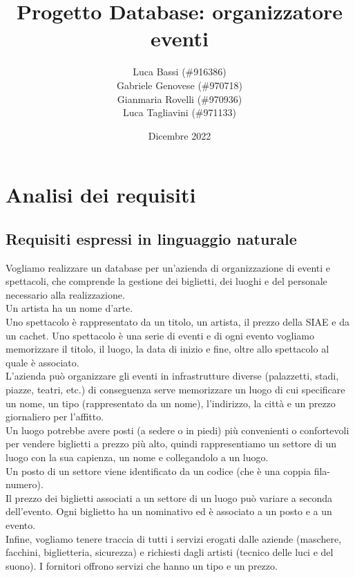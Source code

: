 \documentclass[a4paper,11pt]{article}
\title{Progetto Database: organizzatore eventi}
\author{Luca Bassi (\#916386)\\Gabriele Genovese (\#970718)\\Gianmaria Rovelli (\#970936)\\Luca Tagliavini (\#971133)}
\date{Dicembre 2022}
\begin{document}
\maketitle

\tableofcontents

\newpage

\section{Analisi dei requisiti}

\subsection{Requisiti espressi in linguaggio naturale}

Vogliamo realizzare un database per un'azienda di organizzazione di eventi e spettacoli, che comprende la gestione dei biglietti, dei luoghi e del personale necessario alla realizzazione.\\
Un artista ha un nome d'arte.\\
Uno spettacolo è rappresentato da un titolo, un artista, il prezzo della SIAE e da un cachet. Uno spettacolo è una serie di eventi e di ogni evento vogliamo memorizzare il titolo, il luogo, la data di inizio e fine, oltre allo spettacolo al quale è associato.\\
L'azienda può organizzare gli eventi in infrastrutture diverse (palazzetti, stadi, piazze, teatri, etc.) di conseguenza serve memorizzare un luogo di cui specificare un nome, un tipo (rappresentato da un nome), l'indirizzo, la città e un prezzo giornaliero per l'affitto.\\
Un luogo potrebbe avere posti (a sedere o in piedi) più convenienti o confortevoli per vendere biglietti a prezzo più alto, quindi rappresentiamo un settore di un luogo con la sua capienza, un nome e collegandolo a un luogo.\\
Un posto di un settore viene identificato da un codice (che è una coppia fila-numero).\\
Il prezzo dei biglietti associati a un settore di un luogo può variare a seconda dell'evento. Ogni biglietto ha un nominativo ed è associato a un posto e a un evento.\\
Infine, vogliamo tenere traccia di tutti i servizi erogati dalle aziende (maschere, facchini, biglietteria, sicurezza) e richiesti dagli artisti (tecnico delle luci e del suono). I fornitori offrono servizi che hanno un tipo e un prezzo.
\end{document}
